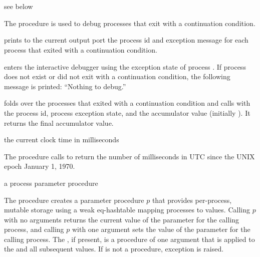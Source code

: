 \begin{procedure}
  \\
  \\
  \strut
\end{procedure}
\returns{} see below

The  procedure is used to debug processes that exit with a
continuation condition.

 prints to the current output port the process id and
exception message for each process that exited with a continuation
condition.

 enters the interactive debugger using the
exception state of process . If process  does not
exist or did not exit with a continuation condition, the following
message is printed: ``Nothing to debug.''

 folds over the processes that
exited with a continuation condition and calls  with the
process id, process exception state, and the accumulator value
(initially ). It returns the final accumulator value.

\begin{procedure}
\end{procedure}
\returns{} the current clock time in milliseconds

The  procedure calls  to
return the number of milliseconds in UTC since the UNIX epoch January
1, 1970.

\begin{procedure}
\end{procedure}
\returns{} a process parameter procedure

The  procedure creates a parameter
procedure $p$ that provides per-process, mutable storage using a weak
eq-hashtable mapping processes to values. Calling $p$ with no
arguments returns the current value of the parameter for the calling
process, and calling $p$ with one argument sets the value of the
parameter for the calling process. The , if present, is a
procedure of one argument that is applied to the  and all
subsequent values. If  is not a procedure, exception
 is raised.

